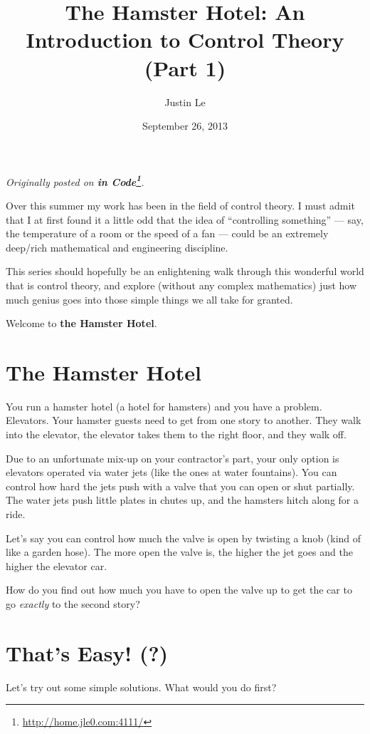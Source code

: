 \documentclass[]{article}
\title{The Hamster Hotel: An Introduction to Control Theory (Part 1)}
\author{Justin Le}
\date{September 26, 2013}
\renewcommand{\href}[2]{#2\footnote{\url{#1}}}
\begin{document}
\maketitle

\emph{Originally posted on \textbf{\href{http://home.jle0.com:4111/}{in
Code}}.}

Over this summer my work has been in the field of control theory. I must
admit that I at first found it a little odd that the idea of
``controlling something'' --- say, the temperature of a room or the
speed of a fan --- could be an extremely deep/rich mathematical and
engineering discipline.

This series should hopefully be an enlightening walk through this
wonderful world that is control theory, and explore (without any complex
mathematics) just how much genius goes into those simple things we all
take for granted.

Welcome to \textbf{the Hamster Hotel}.

\section{The Hamster Hotel}\label{the-hamster-hotel}

You run a hamster hotel (a hotel for hamsters) and you have a problem.
Elevators. Your hamster guests need to get from one story to another.
They walk into the elevator, the elevator takes them to the right floor,
and they walk off.

Due to an unfortunate mix-up on your contractor's part, your only option
is elevators operated via water jets (like the ones at water fountains).
You can control how hard the jets push with a valve that you can open or
shut partially. The water jets push little plates in chutes up, and the
hamsters hitch along for a ride.

Let's say you can control how much the valve is open by twisting a knob
(kind of like a garden hose). The more open the valve is, the higher the
jet goes and the higher the elevator car.

How do you find out how much you have to open the valve up to get the
car to go \emph{exactly} to the second story?

\section{That's Easy! (?)}\label{thats-easy}

Let's try out some simple solutions. What would you do first?
\end{document}
